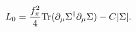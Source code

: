 \begin{equation}
L_0={f_\pi^2\over 4}{\rm Tr}(\partial_\mu \Sigma^\dagger \partial_\mu \Sigma)
-C|\Sigma|.
\end{equation}

